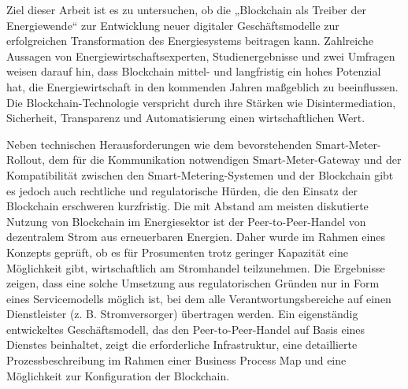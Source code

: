 Ziel dieser Arbeit ist es zu untersuchen, ob die „Blockchain als Treiber der Energiewende“ zur Entwicklung neuer digitaler Geschäftsmodelle zur erfolgreichen Transformation des Energiesystems beitragen kann. Zahlreiche Aussagen von Energiewirtschaftsexperten, Studienergebnisse und zwei Umfragen weisen darauf hin, dass Blockchain mittel- und langfristig ein hohes Potenzial hat, die Energiewirtschaft in den kommenden Jahren maßgeblich zu beeinflussen. Die Blockchain-Technologie verspricht durch ihre Stärken wie Disintermediation, Sicherheit, Transparenz und Automatisierung einen wirtschaftlichen Wert.
\newline

Neben technischen Herausforderungen wie dem bevorstehenden Smart-Meter-Rollout, dem für die Kommunikation notwendigen Smart-Meter-Gateway und der Kompatibilität zwischen den Smart-Metering-Systemen und der Blockchain gibt es jedoch auch rechtliche und regulatorische Hürden, die den Einsatz der Blockchain erschweren kurzfristig. Die mit Abstand am meisten diskutierte Nutzung von Blockchain im Energiesektor ist der Peer-to-Peer-Handel von dezentralem Strom aus erneuerbaren Energien. Daher wurde im Rahmen eines Konzepts geprüft, ob es für Prosumenten trotz geringer Kapazität eine Möglichkeit gibt, wirtschaftlich am Stromhandel teilzunehmen. Die Ergebnisse zeigen, dass eine solche Umsetzung aus regulatorischen Gründen nur in Form eines Servicemodells möglich ist, bei dem alle Verantwortungsbereiche auf einen Dienstleister (z. B. Stromversorger) übertragen werden. Ein eigenständig entwickeltes Geschäftsmodell, das den Peer-to-Peer-Handel auf Basis eines Dienstes beinhaltet, zeigt die erforderliche Infrastruktur, eine detaillierte Prozessbeschreibung im Rahmen einer Business Process Map und eine Möglichkeit zur Konfiguration der Blockchain.

